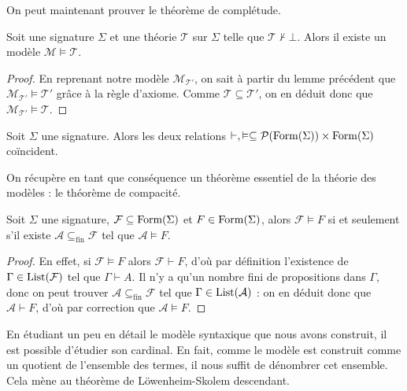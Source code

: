 On peut maintenant prouver le théorème de complétude.

\begin{theorem}
  Soit une signature $\Sigma$ et une théorie $\mathcal T$ sur $\Sigma$ telle que
  $\mathcal T\nvdash\bot$. Alors il existe un modèle
  $\mathcal M\models \mathcal T$.
\end{theorem}

\begin{proof}
  En reprenant notre modèle $\mathcal M_{\mathcal T'}$, on sait à partir du lemme
  précédent que $\mathcal M_{\mathcal T'}\models \mathcal T'$ grâce à la règle
  d'axiome. Comme $\mathcal T\subseteq\mathcal T'$, on en déduit donc que
  $\mathcal M_{\mathcal T'}\models \mathcal T$.
\end{proof}

\begin{theorem}\label{thm.completude}
  Soit $\Sigma$ une signature. Alors les deux relations
  $\vdash,\vDash\subseteq \mathcal{P}(\operatorname{Form}(\Sigma))\times\operatorname{Form}(\Sigma)$
  coïncident.
\end{theorem}

On récupère en tant que conséquence un théorème essentiel de la théorie des
modèles : le théorème de compacité.

\begin{theorem}
  Soit $\Sigma$ une signature, $\mathcal F \subseteq\operatorname{Form}(\Sigma)$ et
  $F\in\operatorname{Form}(\Sigma)$, alors $\mathcal F\vDash F$ si et seulement s'il existe
  $\mathcal A\subseteq_{\mathrm{fin}} \mathcal F$ tel que
  $\mathcal A\vDash F$.
\end{theorem}

\begin{proof}
  En effet, si $\mathcal F\vDash F$ alors $\mathcal F\vdash F$, d'où par
  définition l'existence de $\Gamma\in\operatorname{List}(\mathcal F)$ tel que
  $\Gamma\vdash A$. Il n'y a qu'un nombre fini de propositions dans $\Gamma$,
  donc on peut trouver $\mathcal A\subseteq_{\mathrm{fin}}\mathcal F$ tel que
  $\Gamma\in\operatorname{List}(\mathcal A)$ : on en déduit donc que $\mathcal A\vdash F$,
  d'où par correction que $\mathcal A\vDash F$.
\end{proof}

En étudiant un peu en détail le modèle syntaxique que nous avons construit, il
est possible d'étudier son cardinal. En fait, comme le modèle est construit
comme un quotient de l'ensemble des termes, il nous suffit de dénombrer cet
ensemble. Cela mène au théorème de Löwenheim-Skolem descendant.

